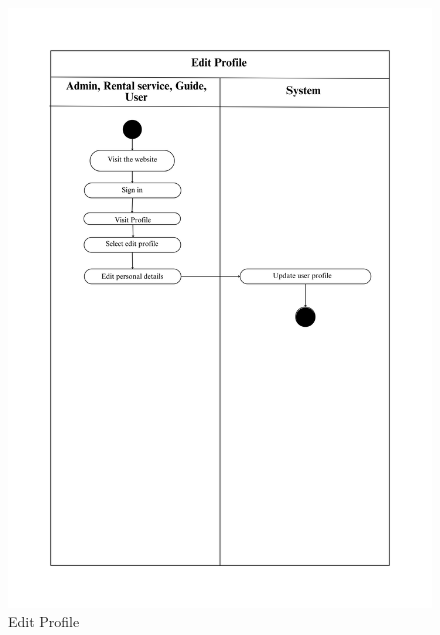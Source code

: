 \begin{figure}[h]
    \centering
    \includegraphics[width=1\textwidth]{Images/Activity Diagrams/5 Edit Profile.png}
    \caption{Edit Profile}
    \label{fig:activity-edit-profile}
\end{figure}

